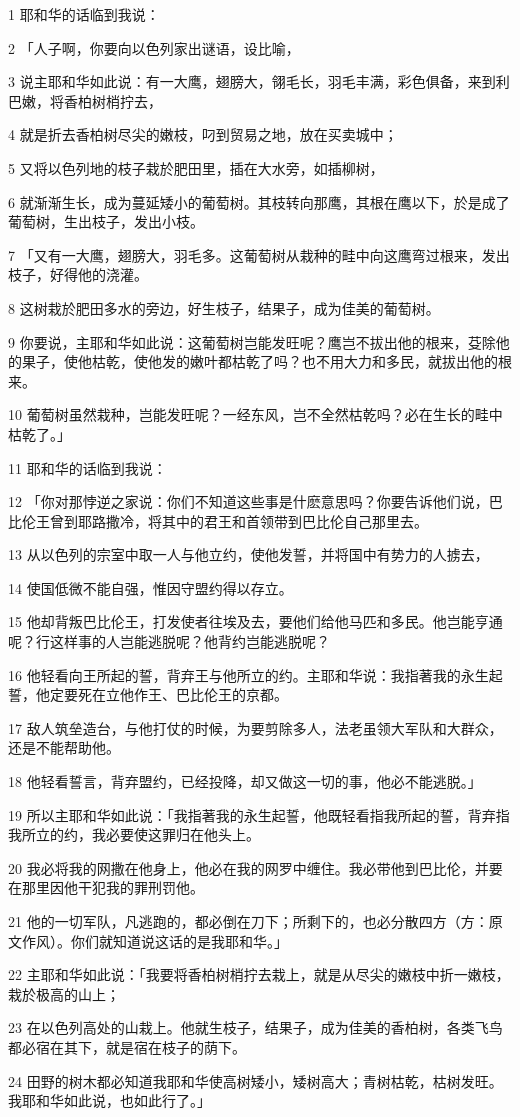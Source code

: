 \par 1 耶和华的话临到我说：
\par 2 「人子啊，你要向以色列家出谜语，设比喻，
\par 3 说主耶和华如此说：有一大鹰，翅膀大，翎毛长，羽毛丰满，彩色俱备，来到利巴嫩，将香柏树梢拧去，
\par 4 就是折去香柏树尽尖的嫩枝，叼到贸易之地，放在买卖城中；
\par 5 又将以色列地的枝子栽於肥田里，插在大水旁，如插柳树，
\par 6 就渐渐生长，成为蔓延矮小的葡萄树。其枝转向那鹰，其根在鹰以下，於是成了葡萄树，生出枝子，发出小枝。
\par 7 「又有一大鹰，翅膀大，羽毛多。这葡萄树从栽种的畦中向这鹰弯过根来，发出枝子，好得他的浇灌。
\par 8 这树栽於肥田多水的旁边，好生枝子，结果子，成为佳美的葡萄树。
\par 9 你要说，主耶和华如此说：这葡萄树岂能发旺呢？鹰岂不拔出他的根来，芟除他的果子，使他枯乾，使他发的嫩叶都枯乾了吗？也不用大力和多民，就拔出他的根来。
\par 10 葡萄树虽然栽种，岂能发旺呢？一经东风，岂不全然枯乾吗？必在生长的畦中枯乾了。」
\par 11 耶和华的话临到我说：
\par 12 「你对那悖逆之家说：你们不知道这些事是什麽意思吗？你要告诉他们说，巴比伦王曾到耶路撒冷，将其中的君王和首领带到巴比伦自己那里去。
\par 13 从以色列的宗室中取一人与他立约，使他发誓，并将国中有势力的人掳去，
\par 14 使国低微不能自强，惟因守盟约得以存立。
\par 15 他却背叛巴比伦王，打发使者往埃及去，要他们给他马匹和多民。他岂能亨通呢？行这样事的人岂能逃脱呢？他背约岂能逃脱呢？
\par 16 他轻看向王所起的誓，背弃王与他所立的约。主耶和华说：我指著我的永生起誓，他定要死在立他作王、巴比伦王的京都。
\par 17 敌人筑垒造台，与他打仗的时候，为要剪除多人，法老虽领大军队和大群众，还是不能帮助他。
\par 18 他轻看誓言，背弃盟约，已经投降，却又做这一切的事，他必不能逃脱。」
\par 19 所以主耶和华如此说：「我指著我的永生起誓，他既轻看指我所起的誓，背弃指我所立的约，我必要使这罪归在他头上。
\par 20 我必将我的网撒在他身上，他必在我的网罗中缠住。我必带他到巴比伦，并要在那里因他干犯我的罪刑罚他。
\par 21 他的一切军队，凡逃跑的，都必倒在刀下；所剩下的，也必分散四方（方：原文作风）。你们就知道说这话的是我耶和华。」
\par 22 主耶和华如此说：「我要将香柏树梢拧去栽上，就是从尽尖的嫩枝中折一嫩枝，栽於极高的山上；
\par 23 在以色列高处的山栽上。他就生枝子，结果子，成为佳美的香柏树，各类飞鸟都必宿在其下，就是宿在枝子的荫下。
\par 24 田野的树木都必知道我耶和华使高树矮小，矮树高大；青树枯乾，枯树发旺。我耶和华如此说，也如此行了。」

